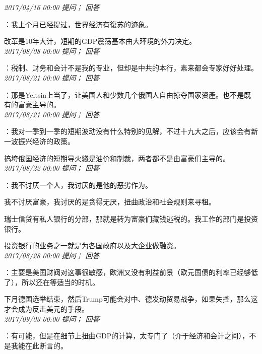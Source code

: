 \documentclass[twocolumn]{ctexart}
\begin{document}
\textit{\hfill\noindent\small 2017/04/16 00:00 提问； 回答}

：我上个月已经提过，世界经济有復苏的迹象。

改革是10年大计，短期的GDP震荡基本由大环境的外力决定。\\

\textit{\hfill\noindent\small 2017/08/08 00:00 提问； 回答}

：税制、财务和会计不是我的专业，但却是中共的本行，素来都会专家好好处理。\\

\textit{\hfill\noindent\small 2017/08/21 00:00 提问； 回答}

：那是Yeltsin上当了，让美国人和少数几个俄国人自由掠夺国家资產。也不是既有的富豪主导的。\\

\textit{\hfill\noindent\small 2017/08/21 00:00 提问； 回答}

：我对一季到一季的短期波动没有什么特别的见解，不过十九大之后，应该会有新一波振兴经济的政策。

搞垮俄国经济的短期导火綫是油价和制裁，两者都不是由富豪们主导的。
\\

\textit{\hfill\noindent\small 2017/08/22 00:00 提问； 回答}

：我不讨厌一个人，我讨厌的是他的恶劣作为。

我不讨厌富豪，我讨厌的是贪得无厌，扭曲政治和社会规则来寻租。

瑞士信贷有私人银行的分部，那就是转为富豪们藏钱逃税的。我工作的部门是投资银行。

投资银行的业务之一就是为各国政府以及大企业做融资。\\

\textit{\hfill\noindent\small 2017/08/28 00:00 提问； 回答}

：主要是美国财阀对这事很敏感，欧洲又没有利益前景（欧元国债的利率已经够低了），所以还在等适当的时机。

下月德国选举结束，然后Trump可能会对中、德发动贸易战争，如果失控，那么这才会成为反击美元的手段。\\

\textit{\hfill\noindent\small 2017/09/03 00:00 提问； 回答}

：有可能，但是在细节上扭曲GDP的计算，太专门了（介于经济和会计之间），不是我能在此断言的。\\
\end{document}
